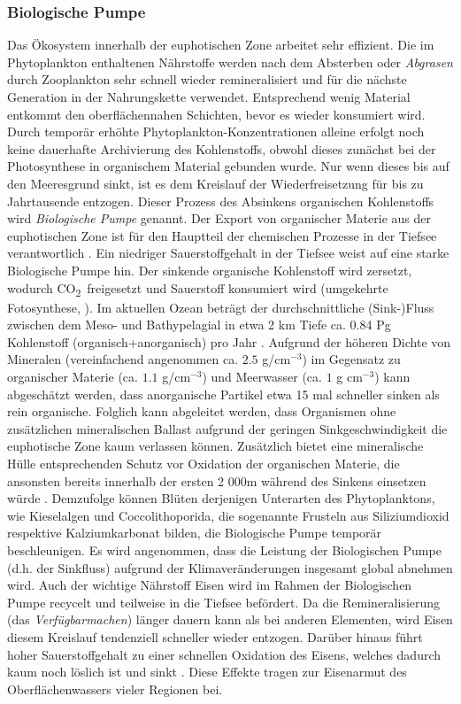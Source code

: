 \documentclass[12pt,a4paper,onecolumn]{scrartcl}
\newcommand{\cotwo}{CO\textsubscript{2}}
\begin{document}
\subsubsection{Biologische Pumpe} \label{sec:biopump}
Das Ökosystem innerhalb der euphotischen Zone arbeitet sehr effizient. Die im Phytoplankton enthaltenen Nährstoffe werden nach dem Absterben oder \textit{Abgrasen} durch Zooplankton sehr schnell wieder remineralisiert und für die nächste Generation in der Nahrungskette verwendet. Entsprechend wenig Material entkommt den oberflächennahen Schichten, bevor es wieder konsumiert wird. Durch temporär erhöhte Phytoplankton-Konzentrationen alleine erfolgt noch keine dauerhafte Archivierung des Kohlenstoffs, obwohl dieses zunächst bei der Photosynthese in organischem Material gebunden wurde. Nur wenn dieses bis auf den Meeresgrund sinkt, ist es dem Kreislauf der Wiederfreisetzung für bis zu Jahrtausende entzogen. Dieser Prozess des Absinkens organischen Kohlenstoffs wird \textit{Biologische Pumpe} genannt. Der Export von organischer Materie aus der euphotischen Zone ist für den Hauptteil der chemischen Prozesse in der Tiefsee verantwortlich \citep{Emerson.2009}. Ein niedriger Sauerstoffgehalt in der Tiefsee weist auf eine starke Biologische Pumpe hin. Der sinkende organische Kohlenstoff wird zersetzt, wodurch \cotwo \ freigesetzt und Sauerstoff konsumiert wird (umgekehrte Fotosynthese, \cite{Honjo.2008}). Im aktuellen Ozean beträgt der durchschnittliche (Sink-)Fluss zwischen dem Meso- und Bathypelagial in etwa 2 km Tiefe ca. 0.84 Pg Kohlenstoff (organisch+anorganisch) pro Jahr \citep{Honjo.2008}. Aufgrund der höheren Dichte von Mineralen (vereinfachend angenommen ca. $2.5$ g/cm$^{-3}$) im Gegensatz zu organischer Materie (ca. $1.1$ g/cm$^{-3}$) und Meerwasser (ca. $1$ g cm$^{-3}$) kann abgeschätzt werden, dass anorganische Partikel etwa 15 mal schneller sinken als rein organische. Folglich kann abgeleitet werden, dass Organismen ohne zusätzlichen mineralischen Ballast aufgrund der geringen Sinkgeschwindigkeit die euphotische Zone kaum verlassen können. Zusätzlich bietet eine mineralische Hülle entsprechenden Schutz vor Oxidation der organischen Materie, die ansonsten bereits innerhalb der ersten 2 000m während des Sinkens einsetzen würde \citep{Emerson.2009}. Demzufolge können Blüten derjenigen Unterarten des Phytoplanktons, wie Kieselalgen und Coccolithoporida, die sogenannte Frusteln aus Siliziumdioxid respektive Kalziumkarbonat bilden, die Biologische Pumpe temporär beschleunigen. Es wird angenommen, dass die Leistung der Biologischen Pumpe (d.h. der Sinkfluss) aufgrund der Klimaveränderungen insgesamt global abnehmen wird. Auch der wichtige Nährstoff Eisen wird im Rahmen der Biologischen Pumpe recycelt und teilweise in die Tiefsee befördert. Da die Remineralisierung (das \textit{Verfügbarmachen}) länger dauern kann als bei anderen Elementen, wird Eisen diesem Kreislauf tendenziell schneller wieder entzogen. Darüber hinaus führt hoher Sauerstoffgehalt zu einer schnellen Oxidation des Eisens, welches dadurch kaum noch löslich ist und sinkt \citep{Falkowski.1998}. Diese  Effekte tragen zur Eisenarmut des Oberflächenwassers vieler Regionen bei.
\end{document}
